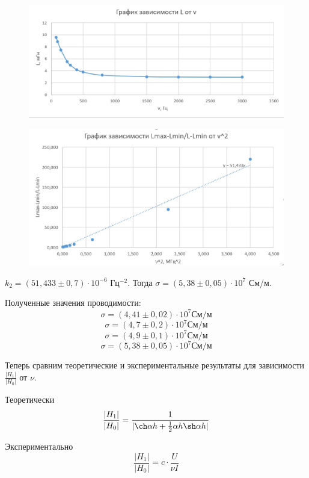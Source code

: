 \documentclass[a4paper,12pt]{article}
\begin{document}
\begin{figure}[H]
	\begin{center}	\includegraphics[width=1\textwidth]{graphik4.jpg}
	\end{center}
\end{figure}
\begin{figure}[H]
	\begin{center}	\includegraphics[width=1\textwidth]{graphik5.jpg}
	\end{center}
\end{figure}
$k_2 = (51,433 \pm 0,7) \cdot 10^{-6}$ Гц$^{-2}$. Тогда $\sigma = (5,38 \pm 0,05) \cdot 10^7$ См/м.

Полученные значения проводимости:
\[\sigma = (4,41 \pm 0,02) \cdot 10^7 \text{См/м}\]
\[\sigma = (4,7 \pm 0,2) \cdot 10^7 \text{См/м}\]
\[\sigma = (4,9 \pm 0,1) \cdot 10^7 \text{См/м}\]
\[\sigma = (5,38 \pm 0,05) \cdot 10^7 \text{См/м}\]

Теперь сравним теоретические и экспериментальные результаты для зависимости $\frac{|H_1|}{|H_0|}$ от $\nu$.

Теоретически
\[\frac{|H_1|}{|H_0|} = \frac{1}{|\ch\alpha h + \frac{1}{2} \alpha h \sh \alpha h|}\]

Экспериментально
\[\frac{|H_1|}{|H_0|} = c \cdot \frac{U}{\nu I}\]
\end{document}
